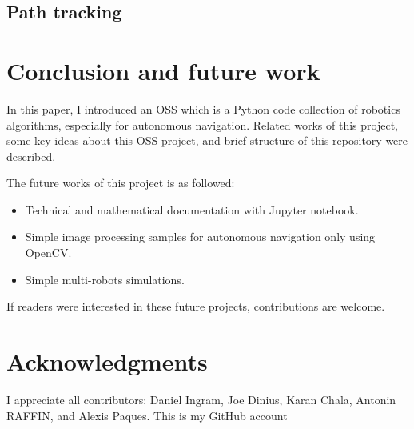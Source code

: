 \documentclass{bmvc2k}
\begin{document}
\subsection{Path tracking}


\section{Conclusion and future work}

In this paper, I introduced an OSS which is a Python code collection of robotics algorithms, especially for autonomous navigation. Related works of this project, some key ideas about this OSS project, and brief structure of this repository were described. 

The future works of this project is as followed: 

\begin{itemize}
 \item Technical and mathematical documentation with Jupyter notebook\cite{JupyterNotebook}.  
 \item Simple image processing samples for autonomous navigation only using OpenCV\cite{opencv}.
 \item Simple multi-robots simulations.
\end{itemize}

If readers were interested in these future projects, contributions are welcome.



\section{Acknowledgments}

I appreciate all contributors: Daniel Ingram\cite{auther1}, Joe Dinius\cite{auther2}, Karan Chala\cite{auther3}, Antonin RAFFIN\cite{auther4}, and Alexis Paques\cite{auther6}. This is my GitHub account\cite{auther5}


\end{document}
